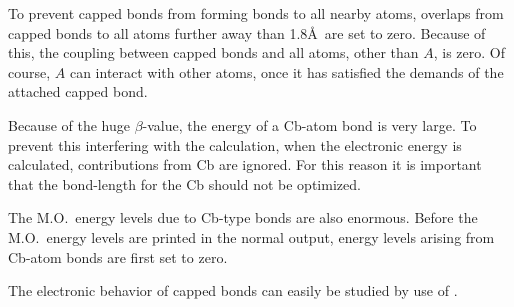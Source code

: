 To prevent capped bonds from forming bonds to all nearby atoms, overlaps from
capped bonds to all atoms further away than 1.8\AA\ are set to zero.  Because
of this, the coupling between capped bonds and all atoms, other than $A$, is
zero. Of course, $A$ can interact with other atoms, once it has satisfied the
demands of the attached capped bond.

Because of the  huge $\beta$-value, the energy of a Cb-atom bond is very large.
To prevent this interfering with the calculation, when the electronic energy is
calculated, contributions from Cb are ignored.  For this reason it is important
that the bond-length for the Cb should not be optimized.

The M.O.\ energy levels due to Cb-type bonds are also enormous.  Before the
M.O.\ energy levels are printed in the normal output, energy levels arising
from Cb-atom bonds are first set to zero.

The electronic behavior of capped bonds can easily be studied by use of
  .
